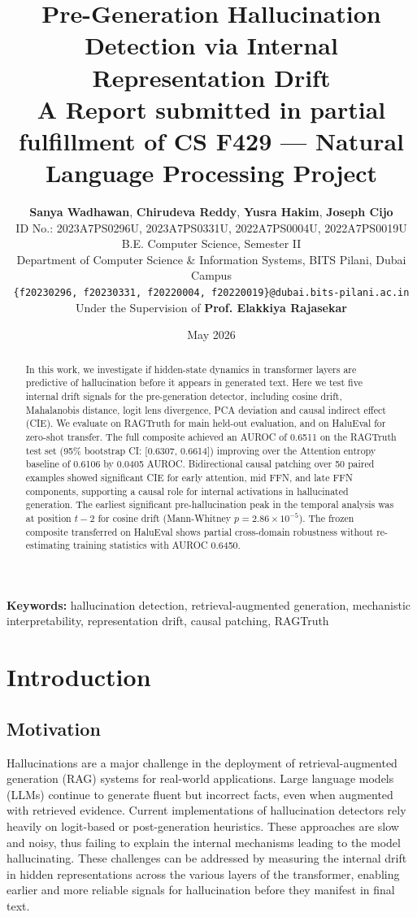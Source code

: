 \documentclass[10pt,twocolumn,a4paper]{article}
\title{\textbf{Pre-Generation Hallucination Detection via Internal Representation Drift}\\[0.5em]
\large A Report submitted in partial fulfillment of CS F429 --- Natural Language Processing Project}
\author{
\textbf{Sanya Wadhawan}, \textbf{Chirudeva Reddy}, \textbf{Yusra Hakim}, \textbf{Joseph Cijo}\\
ID No.: 2023A7PS0296U, 2023A7PS0331U, 2022A7PS0004U, 2022A7PS0019U\\
B.E. Computer Science, Semester II\\
\small Department of Computer Science \& Information Systems, BITS Pilani, Dubai Campus\\
\small \texttt{\{f20230296, f20230331, f20220004, f20220019\}@dubai.bits-pilani.ac.in}\\[0.5em]
\small Under the Supervision of \textbf{Prof. Elakkiya Rajasekar}
}
\date{May 2026}
\begin{document}
\maketitle

\begin{abstract}
In this work, we investigate if hidden-state dynamics in transformer layers are predictive of hallucination before it appears in generated text. Here we test five internal drift signals for the pre-generation detector, including cosine drift, Mahalanobis distance, logit lens divergence, PCA deviation and causal indirect effect (CIE). We evaluate on RAGTruth for main held-out evaluation, and on HaluEval for zero-shot transfer. The full composite achieved an AUROC of 0.6511 on the RAGTruth test set (95\% bootstrap CI: [0.6307, 0.6614]) improving over the Attention entropy baseline of 0.6106 by 0.0405 AUROC. Bidirectional causal patching over 50 paired examples showed significant CIE for early attention, mid FFN, and late FFN components, supporting a causal role for internal activations in hallucinated generation. The earliest significant pre-hallucination peak in the temporal analysis was at position $t-2$ for cosine drift (Mann-Whitney $p = 2.86 \times 10^{-5}$). The frozen composite transferred on HaluEval shows partial cross-domain robustness without re-estimating training statistics with AUROC 0.6450.
\end{abstract}

\textbf{Keywords:} hallucination detection, retrieval-augmented generation, mechanistic interpretability, representation drift, causal patching, RAGTruth

\section{Introduction}
\subsection{Motivation}
Hallucinations are a major challenge in the deployment of retrieval-augmented generation (RAG) systems for real-world applications. Large language models (LLMs) continue to generate fluent but incorrect facts, even when augmented with retrieved evidence. Current implementations of hallucination detectors rely heavily on logit-based or post-generation heuristics. These approaches are slow and noisy, thus failing to explain the internal mechanisms leading to the model hallucinating. These challenges can be addressed by measuring the internal drift in hidden representations across the various layers of the transformer, enabling earlier and more reliable signals for hallucination before they manifest in final text.
\end{document}
